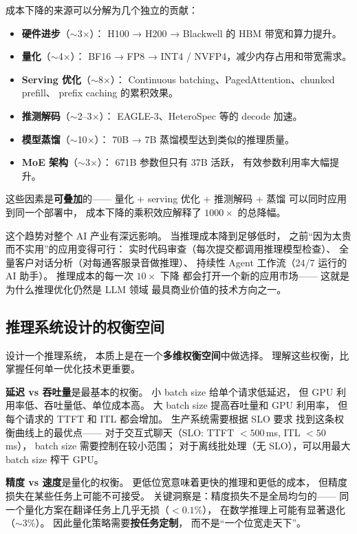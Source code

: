 成本下降的来源可以分解为几个独立的贡献：
\begin{itemize}[noitemsep]
  \item \textbf{硬件进步}（$\sim$3$\times$）：
        H100 → H200 → Blackwell 的 HBM 带宽和算力提升。
  \item \textbf{量化}（$\sim$4$\times$）：
        BF16 → FP8 → INT4 / NVFP4，减少内存占用和带宽需求。
  \item \textbf{Serving 优化}（$\sim$8$\times$）：
        Continuous batching、PagedAttention、chunked prefill、
        prefix caching 的累积效果。
  \item \textbf{推测解码}（$\sim$2--3$\times$）：
        EAGLE-3、HeteroSpec 等的 decode 加速。
  \item \textbf{模型蒸馏}（$\sim$10$\times$）：
        70B → 7B 蒸馏模型达到类似的推理质量。
  \item \textbf{MoE 架构}（$\sim$3$\times$）：
        671B 参数但只有 37B 活跃，
        有效参数利用率大幅提升。
\end{itemize}
这些因素是\textbf{可叠加}的——
量化 + serving 优化 + 推测解码 + 蒸馏
可以同时应用到同一个部署中，
成本下降的乘积效应解释了 $1000\times$ 的总降幅。

这个趋势对整个 AI 产业有深远影响。
当推理成本降到足够低时，
之前``因为太贵而不实用''的应用变得可行：
实时代码审查（每次提交都调用推理模型检查）、
全量客户对话分析（对每通客服录音做推理）、
持续性 Agent 工作流（24/7 运行的 AI 助手）。
推理成本的每一次 $10\times$ 下降
都会打开一个新的应用市场——
这就是为什么推理优化仍然是 LLM 领域
最具商业价值的技术方向之一。

\subsection{推理系统设计的权衡空间}

设计一个推理系统，
本质上是在一个\textbf{多维权衡空间}中做选择。
理解这些权衡，比掌握任何单一优化技术更重要。

\textbf{延迟 vs 吞吐量}是最基本的权衡。
小 batch size 给单个请求低延迟，
但 GPU 利用率低、吞吐量低、单位成本高。
大 batch size 提高吞吐量和 GPU 利用率，
但每个请求的 TTFT 和 ITL 都会增加。
生产系统需要根据 SLO 要求
找到这条权衡曲线上的最优点——
对于交互式聊天（SLO: TTFT $< 500$\,ms, ITL $< 50$\,ms），
batch size 需要控制在较小范围；
对于离线批处理（无 SLO），可以用最大 batch size 榨干 GPU。

\textbf{精度 vs 速度}是量化的权衡。
更低位宽意味着更快的推理和更低的成本，
但精度损失在某些任务上可能不可接受。
关键洞察是：精度损失不是全局均匀的——
同一个量化方案在翻译任务上几乎无损（$<0.1\%$），
在数学推理上可能有显著退化（$\sim$3\%）。
因此量化策略需要\textbf{按任务定制}，
而不是``一个位宽走天下''。

